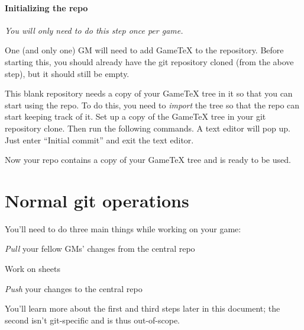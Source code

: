 \documentclass[green]{testgame}
\begin{document}
\paragraph*{Initializing the repo} \emph{You will only need to do this step once per game.}

One (and only one) GM will need to add GameTeX to the repository. Before starting this, you should already have the git repository cloned (from the above step), but it should still be empty.

This blank repository needs a copy of your GameTeX tree in it so that you can
start using the repo. To do this, you need to \emph{import} the tree so that
the repo can start keeping track of it. Set up a copy of the GameTeX tree in
your git repository clone. Then run the following commands. A text editor will
pop up. Just enter ``Initial commit'' and exit the text editor.


Now your repo contains a copy of your GameTeX tree and is ready to be
used.

\section{Normal git operations}

You'll need to do three main things while working on your game:
\begin{enum}[]
\item \emph{Pull} your fellow GMs' changes from the central repo
\item Work on sheets
\item \emph{Push} your changes to the central repo
\end{enum}

You'll learn more about the first and third steps later in this document; the second isn't git-specific and is thus out-of-scope.
\end{document}
